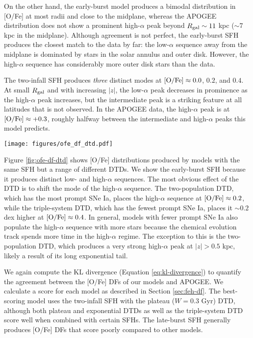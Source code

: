 \documentclass[twocolumn,twocolappendix,linenumbers,trackchanges]{aastex631}
\begin{document}
On the other hand, the early-burst model produces a bimodal distribution in [O/Fe] at most radii and close to the midplane, whereas the APOGEE distribution does not show a prominent high-$\alpha$ peak beyond $R_{\rm gal}\sim11$ kpc ($\sim7$ kpc in the midplane). 
Although agreement is not perfect, the early-burst SFH produces the closest match to the data by far: the low-$\alpha$ sequence away from the midplane is dominated by stars in the solar annulus and outer disk. However, the high-$\alpha$ sequence has considerably more outer disk stars than the data.

The two-infall SFH produces \textit{three} distinct modes at ${\rm [O/Fe]}\approx 0.0$, $0.2$, and $0.4$. At small $R_{\rm gal}$ and with increasing $|z|$, the low-$\alpha$ peak decreases in prominence as the high-$\alpha$ peak increases, but the intermediate peak is a striking feature at all latitudes that is not observed. In the APOGEE data, the high-$\alpha$ peak is at ${\rm [O/Fe]}\approx+0.3$, roughly halfway between the intermediate and high-$\alpha$ peaks this model predicts.

\begin{figure*}
    \centering
    \texttt{[image: figures/ofe\_df\_dtd.pdf]}
    \caption{Distributions of [O/Fe] from multi-zone models with different DTDs. In all cases an early-burst SFH is assumed. The plot format is similar to Figure \ref{fig:ofe-df-sfh}.}
    \label{fig:ofe-df-dtd}
\end{figure*}

Figure \ref{fig:ofe-df-dtd} shows [O/Fe] distributions produced by models with the same SFH but a range of different DTDs. We show the early-burst SFH because it produces distinct low- and high-$\alpha$ sequences. The most obvious effect of the DTD is to shift the mode of the high-$\alpha$ sequence. The two-population DTD, which has the most prompt SNe Ia, places the high-$\alpha$ sequence at ${\rm [O/Fe]}\approx 0.2$, while the triple-system DTD, which has the fewest prompt SNe Ia, places it $\sim0.2$ dex higher at ${\rm [O/Fe]}\approx0.4$. In general, models with fewer prompt SNe Ia also populate the high-$\alpha$ sequence with more stars because the chemical evolution track spends more time in the high-$\alpha$ regime. The exception to this is the two-population DTD, which produces a very strong high-$\alpha$ peak at $|z|>0.5$ kpc, likely a result of its long exponential tail.

We again compute the KL divergence (Equation \ref{eq:kl-divergence}) to quantify the agreement between the [O/Fe] DFs of our models and APOGEE. We calculate a score for each model as described in Section \ref{sec:feh-df}. The best-scoring model uses the two-infall SFH with the plateau ($W=0.3$ Gyr) DTD, although both plateau and exponential DTDs as well as the triple-system DTD score well when combined with certain SFHs. The late-burst SFH generally produces [O/Fe] DFs that score poorly compared to other models.
\end{document}
